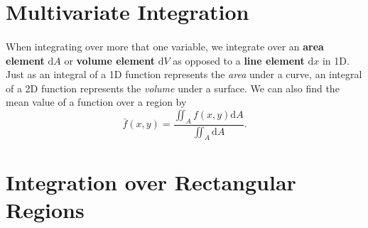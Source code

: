 \documentclass[../multivariate_calculus.tex]{subfiles}
\begin{document}
    \section{Multivariate Integration}
        \paragraph{}
        When integrating over more that one variable, we integrate over an \textbf{area element} $\mathrm{d}A$ or \textbf{volume element} $\mathrm{d}V$ as opposed to a \textbf{line element} $\mathrm{d}x$ in 1D.
        Just as an integral of a 1D function represents the \textit{area} under a curve, an integral of a 2D function represents the \textit{volume} under a surface.
        We can also find the mean value of a function over a region by
        \begin{equation}
            \bar{f}(x,y)=\frac{\iint_A f(x,y)\mathrm{d}A}{\iint_A\mathrm{d}A}.
        \end{equation}

    \section{Integration over Rectangular Regions}
\end{document}
